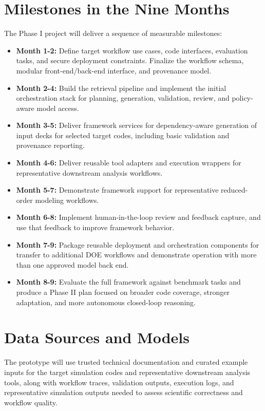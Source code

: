 \documentclass[11pt]{article} \usepackage[margin=1in]{geometry}
\begin{document}
\section{Milestones in the Nine Months} The Phase I project will deliver a
sequence of measurable milestones:

\begin{itemize} \item \textbf{Month 1-2:} Define target workflow use cases, code
interfaces, evaluation tasks, and secure deployment constraints. Finalize the
workflow schema, modular front-end/back-end interface, and provenance model.
\item \textbf{Month 2-4:} Build the retrieval pipeline and implement the initial
orchestration stack for planning, generation, validation, review, and
policy-aware model access.  \item \textbf{Month 3-5:} Deliver framework services
for dependency-aware generation of input decks for selected target codes,
including basic validation and provenance reporting.  \item \textbf{Month 4-6:}
Deliver reusable tool adapters and execution wrappers for representative
downstream analysis workflows.  \item \textbf{Month 5-7:} Demonstrate framework
support for representative reduced-order modeling workflows.  \item
\textbf{Month 6-8:} Implement human-in-the-loop review and feedback capture, and
use that feedback to improve framework behavior.  \item \textbf{Month 7-9:}
Package reusable deployment and orchestration components for transfer to
additional DOE workflows and demonstrate operation with more than one approved
model back end.  \item \textbf{Month 8-9:} Evaluate the full framework against
benchmark tasks and produce a Phase II plan focused on broader code coverage,
stronger adaptation, and more autonomous closed-loop reasoning.  \end{itemize}

\section{Data Sources and Models} The prototype will use trusted technical
documentation and curated example inputs for the target simulation codes and
representative downstream analysis tools, along with workflow traces, validation
outputs, execution logs, and representative simulation outputs needed to assess
scientific correctness and workflow quality.
\end{document}
